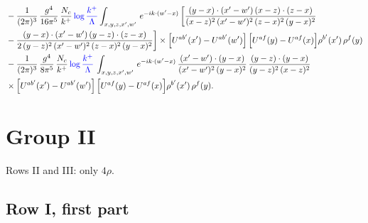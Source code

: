 \documentclass[9pt]{article}
\numberwithin{equation}{section}
\begin{document}
\begin{align}
&-\frac{1}{(2\pi)^{3}}\,\frac{g^{4}}{16\pi^{5}}\,\frac{N_{c}}{k^{+}}\,{\color{blue}\log\frac{k^{+}}{\Lambda}}\int_{x,y,z,x',w'}\,e^{-ik\cdot(w'-x)}\,\bigg[\frac{(y-x)\cdot (x'-w')\,(x-z)\cdot (z-x)}{(x-z)^{2}\,(x'-w')^{2}\,(z-x)^{2}\,(y-x)^{2}}\notag \\ & -\frac{(y-x)\cdot (x'-w')\,(y-z)\cdot (z-x)}{2\,(y-z)^{2}\,(x'-w')^{2}\,(z-x)^{2}\,(y-x)^{2}}\bigg]\times\Big[U^{ab'}(x')-U^{ab'}(w')\Big]\,\Big[U^{af}(y)-U^{af}(x)\Big]\rho^{b'}(x')\,\rho^{f}(y)\notag\\
&-\frac{1}{(2\pi)^{3}}\,\frac{g^{4}}{8\pi^{5}}\,\frac{N_{c}}{k^{+}}\,{\color{blue}\log\frac{k^{+}}{\Lambda}}\,\int_{x,y,z,x',w'}\,e^{-ik\cdot(w'-x)}\,\frac{(x'-w')\cdot(y-x)}{(x'-w')^{2}\,(y-x)^{2}}\,\frac{(y-z)\cdot(y-x)}{(y-z)^{2}\,(x-z)^{2}}\notag\\
&\times\Big[U^{ab'}(x')-U^{ab'}(w')\Big]\,\Big[U^{af}(y)-U^{af}(x)\Big]\rho^{b'}(x')\,\rho^{f}(y).
\end{align}

\section{Group II}
Rows II and III: only $4\rho$.

\subsection{Row I, first part}
\end{document}
